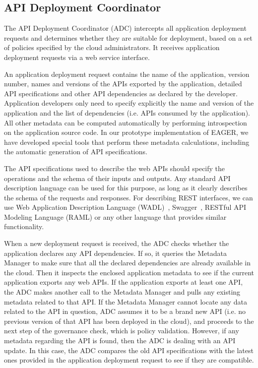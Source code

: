 \subsection{API Deployment Coordinator} 
\label{sec:adc}
The API Deployment Coordinator (ADC)
intercepts all application deployment requests and determines whether they are
suitable for deployment, based on a set of policies specified by the cloud
administrators. It receives application deployment requests via a web service
interface.

An application deployment request contains the name of the application,
version number, names and versions of the APIs exported by the application,
detailed API specifications and other API dependencies as declared by the
developer. Application developers only need to specify explicitly the name and
version of the application and the list of dependencies (i.e. APIs consumed by
the application). All other metadata can be computed automatically by
performing introspection on the application source code. In our prototype
implementation of EAGER, we have developed special tools that perform these
metadata calculations, including the automatic generation of API
specifications.

The API specifications used to describe the web APIs should specify the
operations and the schema of their inputs and outputs.  Any standard API
description language can be used for this purpose, as long as it clearly
describes the schema of the requests and responses. For describing REST
interfaces, we can use Web Application Description Language (WADL)~\cite{hl:wadl}, Swagger~\cite{hl:swagger},
RESTful API Modeling Language (RAML) or any other language that provides similar functionality. %

When a new deployment request is received, the ADC checks whether the
application declares any API dependencies. If so, it queries the Metadata
Manager to make sure that all the declared dependencies are already available
in the cloud.  Then it inspects the enclosed application metadata to see if
the current application exports any web APIs. If the application exports at
least one API, the ADC makes another call to the Metadata Manager and pulls
any existing metadata related to that API. If the Metadata Manager cannot
locate any data related to the API in question, ADC assumes it to be a brand
new API (i.e. no previous version of that API has been deployed in the cloud),
and proceeds to the next step of the governance check, which is policy
validation. However, if any metadata regarding the API is found, then the ADC
is dealing with an API update. In this case, the ADC compares the old API
specifications with the latest ones provided in the application deployment
request to see if they are compatible.

